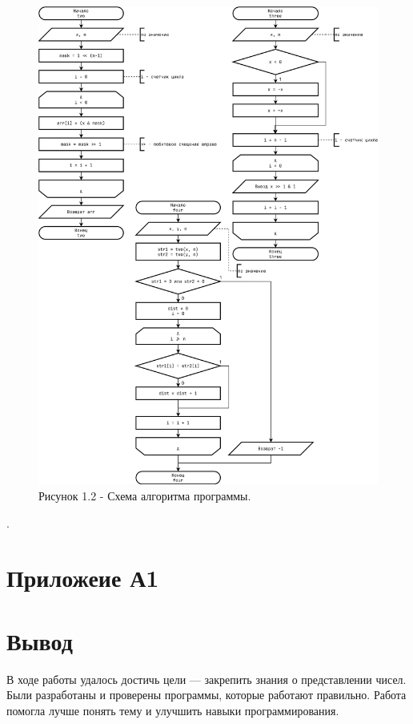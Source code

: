 \documentclass[oneside,a4paper,14pt]{extarticle}
\begin{document}
\begin{figure}[h!]
    \centering
    \includegraphics[height=0.8\textheight]{pics/flowchart_p2.png} 
	\caption*{Рисунок 1.2 - Схема алгоритма программы.}
\end{figure}.\\

\section*{Приложеие А1}

\section*{Вывод}
В ходе работы удалось достичь цели --- закрепить знания о представлении чисел.
Были разработаны и проверены программы, которые работают правильно. Работа
помогла лучше понять тему и улучшить навыки программирования.
\end{document}
